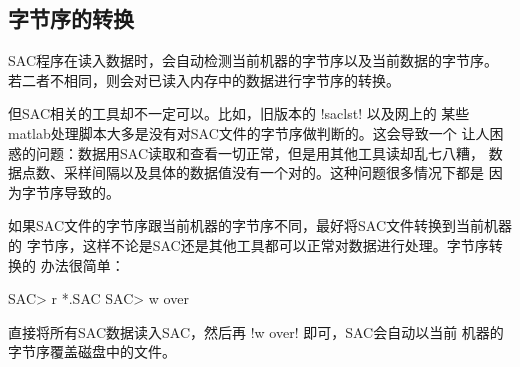\subsection{字节序的转换}
SAC程序在读入数据时，会自动检测当前机器的字节序以及当前数据的字节序。
若二者不相同，则会对已读入内存中的数据进行字节序的转换。

但SAC相关的工具却不一定可以。比如，旧版本的 !saclst! 以及网上的
某些matlab处理脚本大多是没有对SAC文件的字节序做判断的。这会导致一个
让人困惑的问题：数据用SAC读取和查看一切正常，但是用其他工具读却乱七八糟，
数据点数、采样间隔以及具体的数据值没有一个对的。这种问题很多情况下都是
因为字节序导致的。

如果SAC文件的字节序跟当前机器的字节序不同，最好将SAC文件转换到当前机器的
字节序，这样不论是SAC还是其他工具都可以正常对数据进行处理。字节序转换的
办法很简单：
\begin{SACCode}
SAC> r *.SAC
SAC> w over
\end{SACCode}
直接将所有SAC数据读入SAC，然后再 !w over! 即可，SAC会自动以当前
机器的字节序覆盖磁盘中的文件。
